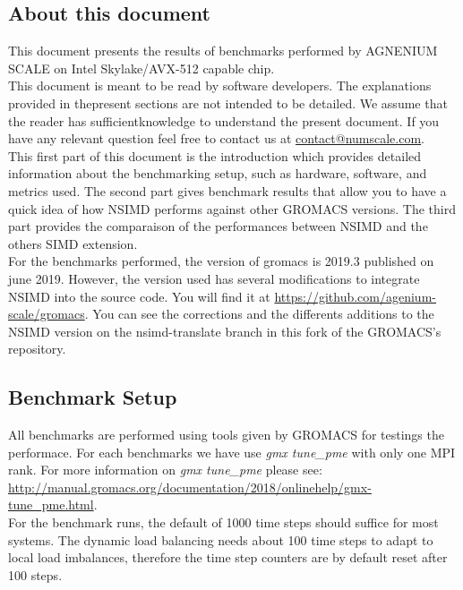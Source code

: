 	\subsection{About this document}
 This document presents the results of benchmarks performed by AGNENIUM SCALE on Intel Skylake/AVX-512 capable chip.\\
 
	This document is meant to be read by software developers.  The explanations provided in thepresent  sections  are  not  intended  to  be  detailed.   We  assume  that  the  reader  has  sufficientknowledge to understand the present document.  If you have any relevant question feel free to contact us at \href{contact@numscale.com}{contact@numscale.com}. \\
 
 This first part of this document is the introduction which provides detailed information about the benchmarking setup, such as hardware, software, and metrics used.  The second part gives benchmark results that allow you to have a quick idea of how NSIMD performs against other GROMACS versions. The third part provides the comparaison of the performances between NSIMD and the others SIMD extension.\\
 
 For the benchmarks performed, the version of gromacs is 2019.3 published on june 2019. However, the version used has several modifications to integrate NSIMD into the source code. You will find it at  \href{https://github.com/agenium-scale/gromacs}{https://github.com/agenium-scale/gromacs}. You can see the corrections and the differents additions to the NSIMD version on the nsimd-translate branch in this fork of the GROMACS's repository.
 
	\subsection{Benchmark Setup}
	
	All benchmarks are performed using tools given by GROMACS for testings the performace. For each benchmarks we have use \textit{gmx tune\_pme} with only one MPI rank. For more information on \textit{gmx tune\_pme} please see: \\\href{http://manual.gromacs.org/documentation/2018/onlinehelp/gmx-tune\_pme.html}{http://manual.gromacs.org/documentation/2018/onlinehelp/gmx-tune\_pme.html}.\\
	
	For the benchmark runs, the default of 1000 time steps should suffice for most systems. The dynamic load balancing needs about 100 time steps to adapt to local load imbalances, therefore the time step counters are by default reset after 100 steps. \\
	
